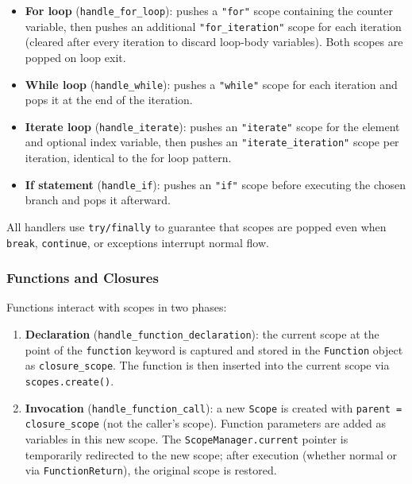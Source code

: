 \begin{itemize}
    \item \textbf{For loop} (\texttt{handle\_for\_loop}): pushes a
          \texttt{"for"} scope containing the counter variable, then
          pushes an additional \texttt{"for\_iteration"} scope for each
          iteration (cleared after every iteration to discard loop-body
          variables).  Both scopes are popped on loop exit.
    \item \textbf{While loop} (\texttt{handle\_while}): pushes a
          \texttt{"while"} scope for each iteration and pops it at the
          end of the iteration.
    \item \textbf{Iterate loop} (\texttt{handle\_iterate}): pushes an
          \texttt{"iterate"} scope for the element and optional index
          variable, then pushes an
          \texttt{"iterate\_iteration"} scope per iteration, identical
          to the for loop pattern.
    \item \textbf{If statement} (\texttt{handle\_if}): pushes an
          \texttt{"if"} scope before executing the chosen branch and
          pops it afterward.
\end{itemize}

All handlers use \texttt{try/finally} to guarantee that scopes are
popped even when \texttt{break}, \texttt{continue}, or exceptions
interrupt normal flow.

\subsubsection{Functions and Closures}

Functions interact with scopes in two phases:

\begin{enumerate}
    \item \textbf{Declaration} (\texttt{handle\_function\_declaration}):
          the current scope at the point of the \texttt{function}
          keyword is captured and stored in the \texttt{Function} object
          as \texttt{closure\_scope}.  The function is then inserted
          into the current scope via \texttt{scopes.create()}.
    \item \textbf{Invocation} (\texttt{handle\_function\_call}):
          a new \texttt{Scope} is created with
          \texttt{parent = closure\_scope} (not the caller's scope).
          Function parameters are added as variables in this new scope.
          The \texttt{ScopeManager.current} pointer is temporarily
          redirected to the new scope; after execution (whether normal
          or via \texttt{FunctionReturn}), the original scope is
          restored.
\end{enumerate}

